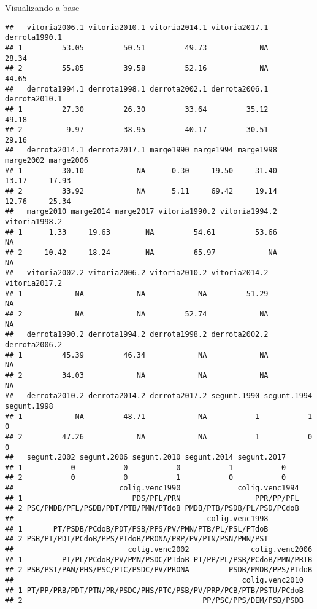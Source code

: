 \documentclass[
  10pt,
  ignorenonframetext,
]{beamer}
\begin{document}
\begin{frame}[fragile]{Visualizando a base}
\begin{verbatim}
##   vitoria2006.1 vitoria2010.1 vitoria2014.1 vitoria2017.1 derrota1990.1
## 1         53.05         50.51         49.73            NA         28.34
## 2         55.85         39.58         52.16            NA         44.65
##   derrota1994.1 derrota1998.1 derrota2002.1 derrota2006.1 derrota2010.1
## 1         27.30         26.30         33.64         35.12         49.18
## 2          9.97         38.95         40.17         30.51         29.16
##   derrota2014.1 derrota2017.1 marge1990 marge1994 marge1998 marge2002 marge2006
## 1         30.10            NA      0.30     19.50     31.40     13.17     17.93
## 2         33.92            NA      5.11     69.42     19.14     12.76     25.34
##   marge2010 marge2014 marge2017 vitoria1990.2 vitoria1994.2 vitoria1998.2
## 1      1.33     19.63        NA         54.61         53.66            NA
## 2     10.42     18.24        NA         65.97            NA            NA
##   vitoria2002.2 vitoria2006.2 vitoria2010.2 vitoria2014.2 vitoria2017.2
## 1            NA            NA            NA         51.29            NA
## 2            NA            NA         52.74            NA            NA
##   derrota1990.2 derrota1994.2 derrota1998.2 derrota2002.2 derrota2006.2
## 1         45.39         46.34            NA            NA            NA
## 2         34.03            NA            NA            NA            NA
##   derrota2010.2 derrota2014.2 derrota2017.2 segunt.1990 segunt.1994 segunt.1998
## 1            NA         48.71            NA           1           1           0
## 2         47.26            NA            NA           1           0           0
##   segunt.2002 segunt.2006 segunt.2010 segunt.2014 segunt.2017
## 1           0           0           0           1           0
## 2           0           0           1           0           0
##                        colig.venc1990             colig.venc1994
## 1                         PDS/PFL/PRN                 PPR/PP/PFL
## 2 PSC/PMDB/PFL/PSDB/PDT/PTB/PMN/PTdoB PMDB/PTB/PSDB/PL/PSD/PCdoB
##                                            colig.venc1998
## 1       PT/PSDB/PCdoB/PDT/PSB/PPS/PV/PMN/PTB/PL/PSL/PTdoB
## 2 PSB/PT/PDT/PCdoB/PPS/PTdoB/PRONA/PRP/PV/PTN/PSN/PMN/PST
##                          colig.venc2002              colig.venc2006
## 1         PT/PL/PCdoB/PV/PMN/PSDC/PTdoB PT/PP/PL/PSB/PCdoB/PMN/PRTB
## 2 PSB/PST/PAN/PHS/PSC/PTC/PSDC/PV/PRONA         PSDB/PMDB/PPS/PTdoB
##                                                    colig.venc2010
## 1 PT/PP/PRB/PDT/PTN/PR/PSDC/PHS/PTC/PSB/PV/PRP/PCB/PTB/PSTU/PCdoB
## 2                                         PP/PSC/PPS/DEM/PSB/PSDB

\end{verbatim}
\end{frame}
\end{document}
